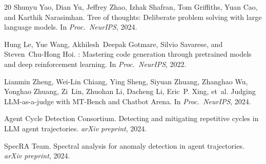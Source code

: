 \documentclass[11pt,a4paper]{article}
\begin{document}
\begin{thebibliography}{20}
Shunyu Yao, Dian Yu, Jeffrey Zhao, Izhak Shafran, Tom Griffiths, Yuan Cao, and Karthik Narasimhan.
\newblock Tree of thoughts: Deliberate problem solving with large language models.
\newblock In \emph{Proc.\ NeurIPS}, 2024.

Hung Le, Yue Wang, Akhilesh~Deepak Gotmare, Silvio Savarese, and Steven~Chu-Hong Hoi.
: Mastering code generation through pretrained models and deep reinforcement learning.
\newblock In \emph{Proc.\ NeurIPS}, 2022.

Lianmin Zheng, Wei-Lin Chiang, Ying Sheng, Siyuan Zhuang, Zhanghao Wu, Yonghao Zhuang, Zi~Lin, Zhuohan Li, Dacheng Li, Eric~P. Xing, et~al.
\newblock Judging {LLM}-as-a-judge with {MT-Bench} and {Chatbot Arena}.
\newblock In \emph{Proc.\ NeurIPS}, 2024.

{Agent Cycle Detection Consortium}.
\newblock Detecting and mitigating repetitive cycles in {LLM} agent trajectories.
\newblock \emph{arXiv preprint}, 2024.

{SpecRA Team}.
\newblock Spectral analysis for anomaly detection in agent trajectories.
\newblock \emph{arXiv preprint}, 2024.

\end{thebibliography}
\end{document}
